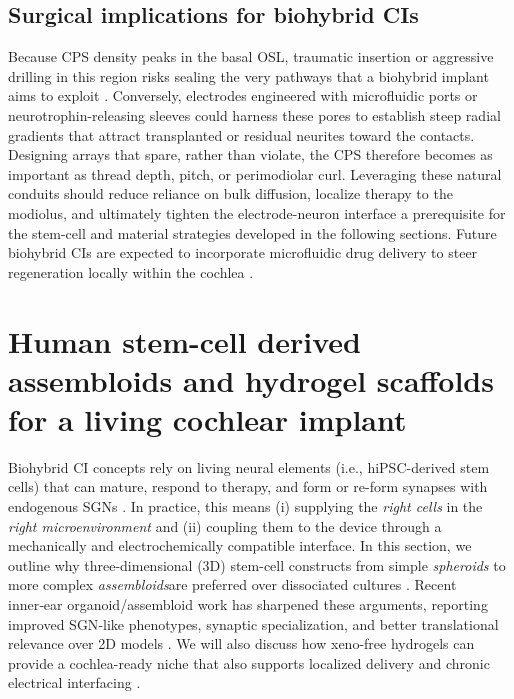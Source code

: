 \documentclass[referee,pdflatex, sn-vancouver-num]{sn-jnl}%
\theoremstyle{thmstyleone}%
\theoremstyle{thmstyletwo}%
\theoremstyle{thmstylethree}%
\begin{document}
\subsection{Surgical implications for biohybrid CIs}  
Because CPS density peaks in the basal OSL, traumatic insertion or aggressive drilling in this region risks sealing the very pathways that a biohybrid implant aims to exploit \cite{shepherd2004, Starovoyt2023_SciRep_CochlearMicrostructures}.  Conversely, electrodes engineered with microfluidic ports or neurotrophin-releasing sleeves could harness these pores to establish steep radial gradients that attract transplanted or residual neurites toward the contacts.  Designing arrays that spare, rather than violate, the CPS therefore becomes as important as thread depth, pitch, or perimodiolar curl.  Leveraging these natural conduits should reduce reliance on bulk diffusion, localize therapy to the modiolus, and ultimately tighten the electrode-neuron interface \textemdash a prerequisite for the stem-cell and material strategies developed in the following sections. Future biohybrid CIs are expected to incorporate microfluidic drug delivery to steer regeneration locally within the cochlea \cite{Carnicer-Lombarte:2025aa}.

\section{Human stem-cell derived assembloids and hydrogel scaffolds for a living cochlear implant}\label{sec4}
Biohybrid CI concepts rely on living neural elements (i.e., hiPSC-derived stem cells) that can mature, respond to therapy, and form or re-form synapses with endogenous SGNs \cite{Nella2022NeurotrophinGradients}. In practice, this means (i) supplying the \emph{right cells} in the \emph{right microenvironment} and (ii) coupling them to the device through a mechanically and electrochemically compatible interface. In this section, we outline why three-dimensional (3D) stem-cell constructs \textemdash from simple \emph{spheroids} to more complex \emph{assembloids}\textemdash are preferred over dissociated cultures \cite{Pasca2022}. Recent inner‑ear organoid/assembloid work has sharpened these arguments, reporting improved SGN‑like phenotypes, synaptic specialization, and better translational relevance over 2D models \cite{Moore2025_CellStemCell, vanDerValk2023_CellRep, Zhang2024_NRR}.
We will also discuss how xeno-free hydrogels can provide a cochlea-ready niche that also supports localized delivery and chronic electrical interfacing \cite{Fakhr2024PeripheralNerve}.
\end{document}
